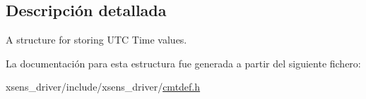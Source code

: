 \subsection{\-Descripción detallada}
\-A structure for storing \-U\-T\-C \-Time values. 

\-La documentación para esta estructura fue generada a partir del siguiente fichero\-:\begin{DoxyCompactItemize}
\item 
xsens\-\_\-driver/include/xsens\-\_\-driver/\hyperlink{cmtdef_8h}{cmtdef.\-h}\end{DoxyCompactItemize}
